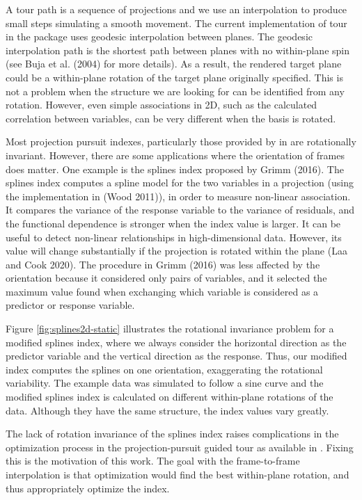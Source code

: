A tour path is a sequence of projections and we use an interpolation to produce small steps simulating a smooth movement. The current implementation of tour in the  package uses geodesic interpolation between planes. The geodesic interpolation path is the shortest path between planes with no within-plane spin (see Buja et al. (2004) for more details). As a result, the rendered target plane could be a within-plane rotation of the target plane originally specified. This is not a problem when the structure we are looking for can be identified from any rotation. However, even simple associations in 2D, such as the calculated correlation between variables, can be very different when the basis is rotated.

Most projection pursuit indexes, particularly those provided by in  are rotationally invariant. However, there are some applications where the orientation of frames does matter. One example is the splines index proposed by Grimm (2016). The splines index computes a spline model for the two variables in a projection (using the implementation in  (Wood 2011)), in order to measure non-linear association. It compares the variance of the response variable to the variance of residuals, and the functional dependence is stronger when the index value is larger. It can be useful to detect non-linear relationships in high-dimensional data. However, its value will change substantially if the projection is rotated within the plane (Laa and Cook 2020). The procedure in Grimm (2016) was less affected by the orientation because it considered only pairs of variables, and it selected the maximum value found when exchanging which variable is considered as a predictor or response variable.

Figure \ref{fig:splines2d-static} illustrates the rotational invariance problem for a modified splines index, where we always consider the horizontal direction as the predictor variable and the vertical direction as the response. Thus, our modified index computes the splines on one orientation, exaggerating the rotational variability. The example data was simulated to follow a sine curve and the modified splines index is calculated on different within-plane rotations of the data. Although they have the same structure, the index values vary greatly.

The lack of rotation invariance of the splines index raises complications in the optimization process in the projection-pursuit guided tour as available in . Fixing this is the motivation of this work. The goal with the frame-to-frame interpolation is that optimization would find the best within-plane rotation, and thus appropriately optimize the index.

